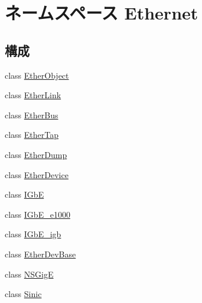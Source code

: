 \hypertarget{namespaceEthernet}{
\section{ネームスペース Ethernet}
\label{namespaceEthernet}
}
\subsection*{構成}
\begin{DoxyCompactItemize}
\item 
class \hyperlink{classEthernet_1_1EtherObject}{EtherObject}
\item 
class \hyperlink{classEthernet_1_1EtherLink}{EtherLink}
\item 
class \hyperlink{classEthernet_1_1EtherBus}{EtherBus}
\item 
class \hyperlink{classEthernet_1_1EtherTap}{EtherTap}
\item 
class \hyperlink{classEthernet_1_1EtherDump}{EtherDump}
\item 
class \hyperlink{classEthernet_1_1EtherDevice}{EtherDevice}
\item 
class \hyperlink{classEthernet_1_1IGbE}{IGbE}
\item 
class \hyperlink{classEthernet_1_1IGbE__e1000}{IGbE\_\-e1000}
\item 
class \hyperlink{classEthernet_1_1IGbE__igb}{IGbE\_\-igb}
\item 
class \hyperlink{classEthernet_1_1EtherDevBase}{EtherDevBase}
\item 
class \hyperlink{classEthernet_1_1NSGigE}{NSGigE}
\item 
class \hyperlink{classEthernet_1_1Sinic}{Sinic}
\end{DoxyCompactItemize}
